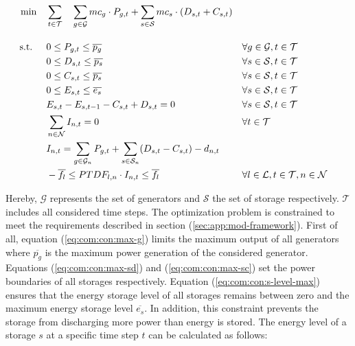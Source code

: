 \begin{subequations}
	\begin{align}
		 \min \quad & \sum_{t\in\mathcal{T}} \quad \sum_{g\in\mathcal{G}}mc_g \cdot P_{g,t} + \sum_{s\in\mathcal{S}}mc_s \cdot (D_{s,t}+C_{s,t})\\[10pt]
		 \text{s.t. } \quad & 0 \leq P_{g,t} \leq \overline{p_g} && \forall g \in \mathcal{G}, t \in \mathcal{T} \label{eq:com:con:max-g}\\
		 & 0 \leq D_{s,t} \leq \overline{p_s} && \forall s \in \mathcal{S}, t \in \mathcal{T} \label{eq:com:con:max-sd}\\
		 & 0 \leq C_{s,t} \leq \overline{p_s} && \forall s \in \mathcal{S}, t \in \mathcal{T} \label{eq:com:con:max-sc}\\
		 & 0 \leq E_{s,t} \leq \overline{e_s} && \forall s \in \mathcal{S}, t \in \mathcal{T} \label{eq:com:con:s-level-max}\\
		 & E_{s,t} - E_{s,t-1} - C_{s,t} + D_{s,t} = 0 && \forall s \in \mathcal{S}, t \in \mathcal{T} \label{eq:com:con:s-level}\\
		 & \sum_{n \in \mathcal{N}} I_{n,t} = 0 && \forall t \in \mathcal{T} \label{eq:com:con:eb}\\
		 & 	I_{n,t} = \sum_{g\in\mathcal{G}_n}P_{g,t} + \sum_{s\in\mathcal{S}_n}(D_{s,t}-C_{s,t})-d_{n,t} \label{eq:com:con:injection-term} \\
		 & -\overline{f_l} \leq PTDF_{l,n} \cdot I_{n,t} \leq \overline{f_l} && \forall l \in \mathcal{L}, t \in \mathcal{T}, n \in \mathcal{N} \label{eq:com:con:pf}
	\end{align}
\end{subequations}

Hereby, $\mathcal{G}$ represents the set of generators and $\mathcal{S}$ the set of storage respectively. $\mathcal{T}$ includes all considered time steps. The optimization problem is constrained to meet the requirements described in section (\ref{sec:app:mod-framework}). First of all, equation (\ref{eq:com:con:max-g}) limits the maximum output of all generators where $\overline{p_g}$ is the maximum power generation of the considered generator. Equations (\ref{eq:com:con:max-sd}) and (\ref{eq:com:con:max-sc}) set the power boundaries of all storages respectively. Equation (\ref{eq:com:con:s-level-max}) ensures that the energy storage level of all storages remains between zero and the maximum energy storage level $\overline{e_s}$. In addition, this constraint prevents the storage from discharging more power than energy is stored. The energy level of a storage $s$ at a specific time step $t$ can be calculated as follows:

